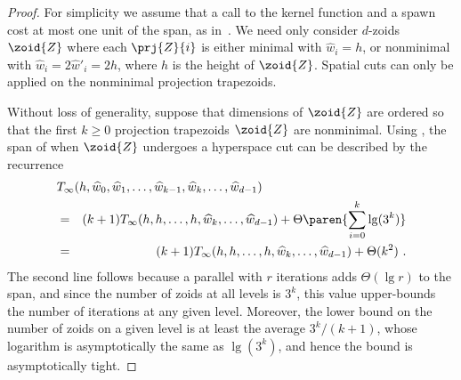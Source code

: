 \begin{proof}

  For simplicity we assume that a call to the kernel function and a
  spawn cost at most one unit of the span, as in~\cite{FrigoSt09}.  We
  need only consider $d$-zoids $\zoid{Z}$ where each $\prj{Z}{i}$ is either
  minimal with ${\widehat{w}}_i = h$, or nonminimal with
  ${\widehat{w}}_i = 2 {\widehat{w}}'_i = 2h$, where $h$ is the height
  of $\zoid{Z}$.  Spatial cuts can only be applied on the nonminimal
  projection trapezoids.

  Without loss of generality, suppose that dimensions of $\zoid{Z}$ are
  ordered so that the first $k\geq 0$ projection trapezoids $\zoid{Z}$
  are nonminimal.  Using , the span of
   when $\zoid{Z}$ undergoes a hyperspace cut can be described
  by the recurrence
\begin{eqnarray*}
\lefteqn{T_{\infty}(h, \widehat{w}_0, \widehat{w}_1, \ldots, \widehat{w}_{k - 1}, \widehat{w}_{k}, \ldots, \widehat{w}_{d - 1})}\\
& = & ( k + 1 ) T_{\infty}(h, h, \ldots, h, \widehat{w}_{k}, \ldots, \widehat{w}_{d - 1})
+ \Theta\paren{\sum_{i = 0}^k\lg(3^k)}\\
& = & ( k + 1 ) T_{\infty}(h, h, \ldots, h, \widehat{w}_{k}, \ldots, \widehat{w}_{d - 1})
+ \Theta(k^2)\ .
\end{eqnarray*}
The second line follows because a parallel \For with $r$ iterations
adds $\Theta(\lg r)$ to the span, and since the number of zoids at all
levels is $3^k$, this value upper-bounds the number of iterations at
any given level.  Moreover, the lower bound on the number of zoids on
a given level is at least the average $3^k/(k+1)$, whose logarithm is
asymptotically the same as $\lg(3^k)$, and hence the bound is
asymptotically tight.


\end{proof}
